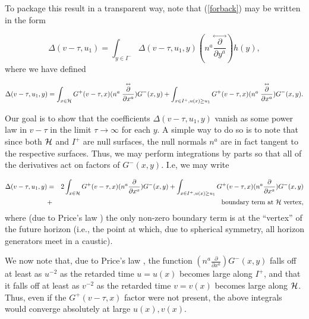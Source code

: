 \documentclass[12pt,onecolumn,eqsecnum,aps,prd,nofootinbib]{revtex4}
\begin{document}
To package this result in a transparent way, note that (\ref{forback}) may be written in the form


\begin{equation}
\Delta(v - \tau, u_1) =\int_{y \in I^-}  \Delta(v - \tau, u_1, y) (n^a  \stackrel
{\leftrightarrow} {\frac{ \partial}{\partial y^a} })  h(y)  ,
\end{equation}
where we have defined 

\begin{equation}
\label{Dcoeffs}
\Delta(v - \tau, u_1, y )=\int_{x \in {\cal H}}  G^+(v-\tau, x)   (n^a  \stackrel
{\leftrightarrow} {\frac{ \partial}{\partial x^a} }) G^-(x, y) +  \int_{x \in {I^+}, u(x) \ge u_1} G^+(v-\tau, x)   (n^a  \stackrel
{\leftrightarrow} {\frac{ \partial}{\partial x^a} }) G^-(x, y)  .
\end{equation}

Our goal is to show that the coefficients $\Delta(v - \tau, u_1, y )$ vanish as some power law in $v-\tau$ in the limit $\tau \rightarrow \infty$ for each $y$.  A simple way to do so is to note that since both ${\cal H}$ and $I^+$ are null surfaces, the null normals $n^a$ are in fact tangent to the respective surfaces.  Thus, we may perform integrations by parts so that all of the derivatives act on factors of $G^-(x, y)$.  I.e, we may write

\begin{eqnarray}
\label{Dcoeffs2}
\Delta(v - \tau, u_1, y )&=& 2 \int_{x \in {\cal H}}  G^+(v-\tau, x)   (n^a  
 {\frac{ \partial}{\partial x^a} }) G^-(x, y) +  \int_{x \in {I^+}, u(x) \ge u_1} G^+(v-\tau, x)   (n^a  
 {\frac{ \partial}{\partial x^a} }) G^-(x, y) \cr  &+& {\rm boundary \ term \ at \ {\cal H} \ vertex },
\end{eqnarray}
where (due to Price's law \cite{GPP,DR}) the only non-zero boundary term is at the ``vertex'' of the future horizon (i.e., the point at which, due to spherical symmetry, all horizon generators meet in a caustic).

We now note that, due to Price's law \cite{GPP,DR}, the function $(n^a  
 {\frac{ \partial}{\partial x^a} }) G^-(x, y)$ falls off at least as $u^{-2}$ as the retarded time $u = u(x)$ becomes large along $I^+$,  and that it falls off at least as $v^{-2}$ as the retarded time $v = v(x)$ becomes large along ${\cal H}$.  Thus, even if the  $G^+(v-\tau, x)$ factor were not present, the above integrals would converge absolutely at large $u(x), v(x)$.  
\end{document}
